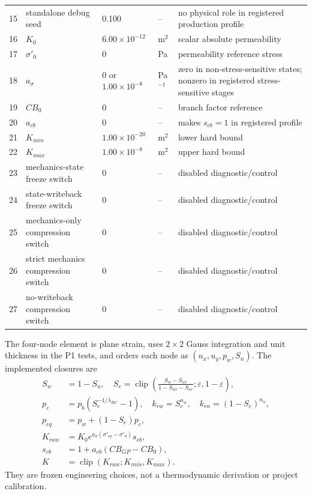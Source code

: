\documentclass[preprint,12pt,authoryear]{elsarticle}
\begin{document}
\begin{longtable}{@{}r p{} p{} p{} p{}@{}}
15 & standalone debug seed & 0.100 & -- & no physical role in registered production profile\\
16 & $K_0$ & $6.00\times10^{-12}$ & m$^2$ & scalar absolute permeability\\
17 & $\sigma'_0$ & 0 & Pa & permeability reference stress\\
18 & $a_\sigma$ & 0 or $1.00\times10^{-8}$ & Pa$^{-1}$ & zero in non-stress-sensitive states; nonzero in registered stress-sensitive stages\\
19 & $CB_0$ & 0 & -- & branch factor reference\\
20 & $a_{cb}$ & 0 & -- & makes $s_{cb}=1$ in registered profile\\
21 & $K_{min}$ & $1.00\times10^{-20}$ & m$^2$ & lower hard bound\\
22 & $K_{max}$ & $1.00\times10^{-8}$ & m$^2$ & upper hard bound\\
23 & mechanics-state freeze switch & 0 & -- & disabled diagnostic/control\\
24 & state-writeback freeze switch & 0 & -- & disabled diagnostic/control\\
25 & mechanics-only compression switch & 0 & -- & disabled diagnostic/control\\
26 & strict mechanics compression switch & 0 & -- & disabled diagnostic/control\\
27 & no-writeback compression switch & 0 & -- & disabled diagnostic/control\\
\bottomrule
\end{longtable}

The four-node element is plane strain, uses $2\times2$ Gauss integration and unit thickness in the P1 tests, and orders each node as $(u_x,u_y,p_w,S_n)$. The implemented closures are
\begin{align}
S_w&=1-S_n,\quad
S_e=\operatorname{clip}\!\left(\frac{S_w-S_{wr}}{1-S_{wr}-S_{nr}};\varepsilon,1-\varepsilon\right),\\
p_c&=p_b(S_e^{-1/\lambda_{BC}}-1),\quad
k_{rw}=S_e^{n_w},\quad k_{rn}=(1-S_e)^{n_n},\\
p_{eq}&=p_w+(1-S_e)p_c,\\
K_{raw}&=K_0e^{a_\sigma(\sigma'_m-\sigma'_0)}s_{cb},\\
s_{cb}&=1+a_{cb}(CB_{GP}-CB_0),\\
K&=\operatorname{clip}(K_{raw};K_{min},K_{max}).
\end{align}
They are frozen engineering choices, not a thermodynamic derivation or project calibration.
\end{document}

